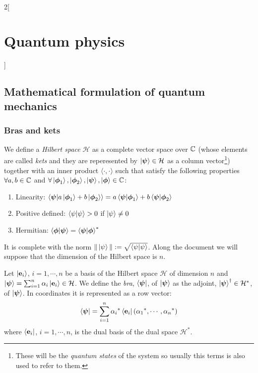 \documentclass[../../../main.tex]{subfiles}
\begin{document}
\renewcommand{\col}{\phy}
\begin{multicols}{2}[\section{Quantum physics}]
  \subsection{Mathematical formulation of quantum mechanics}
  \subsubsection{Bras and kets}
  \begin{definition}[Ket]
    We define a \emph{Hilbert space} $\mathcal{H}$ as a complete vector space over $\mathbb{C}$ (whose elements are called \emph{kets} and they are reperesented by $\ket{\boldsymbol{\mathrm{\psi}}}\in\mathcal{H}$ as a column vector\footnote{These will be the \emph{quantum states} of the system so usually this terms is also used to refer to them.}) together with an inner product $\langle\cdot,\cdot\rangle$ such that satisfy the following properties $\forall a,b\in\mathbb{C}$ and $\forall \ket{\boldsymbol{\mathrm{\phi}}_1},\ket{\boldsymbol{\mathrm{\phi}}_2},\ket{\boldsymbol{\mathrm{\psi}}},\ket{\boldsymbol{\mathrm{\phi}}}\in \mathbb{C}$:
    \begin{enumerate}
      \item Linearity: $\braket{\boldsymbol{\mathrm{\psi}}}{a\ket{\boldsymbol{\mathrm{\phi}}_1}+b\ket{\boldsymbol{\mathrm{\phi}}_2}}=a\braket{\boldsymbol{\mathrm{\psi}}}{\boldsymbol{\mathrm{\phi}}_1}+b\braket{\boldsymbol{\mathrm{\psi}}}{\boldsymbol{\mathrm{\phi}}_2}$
      \item Positive defined: $\braket{\psi}{\psi}>0$ if $\ket{\psi}\ne 0$
      \item Hermitian: $\braket{\boldsymbol{\mathrm{\phi}}}{\boldsymbol{\mathrm{\psi}}}={\braket{\boldsymbol{\mathrm{\psi}}}{\boldsymbol{\mathrm{\phi}}}}^*$
    \end{enumerate}
    It is complete with the norm $\|\ket{\psi}\|:=\sqrt{\braket{\psi}{\psi}}$. Along the document we will suppose that the dimension of the Hilbert space is $n$.
  \end{definition}
  \begin{definition}[Bra]
    Let $\ket{\boldsymbol{\mathrm{e}}_i}$, $i=1,\cdots,n$ be a basis of the Hilbert space $\mathcal{H}$ of dimension $n$ and $\ket{\boldsymbol{\mathrm{\psi}}}=\sum_{i=1}^n\alpha_i\ket{\boldsymbol{\mathrm{e}}_i}\in\mathcal{H}$. We define the \emph{bra}, $\bra{\boldsymbol{\mathrm{\psi}}}$, of $\ket{\boldsymbol{\mathrm{\psi}}}$ as the adjoint, ${\ket{\boldsymbol{\mathrm{\psi}}}}^\dag\in\mathcal{H}^*$, of $\ket{\boldsymbol{\mathrm{\psi}}}$. In coordinates it is represented as a row vector:
    $$\bra{\boldsymbol{\mathrm{\psi}}}=\sum_{i=1}^n{\alpha_i}^*\bra{\boldsymbol{\mathrm{e}}_i}({\alpha_1}^*,\cdots,{\alpha_n}^*)$$ where $\bra{\boldsymbol{\mathrm{e}}_i}$, $i=1,\cdots,n$, is the dual basis of the dual space $\mathcal{H}^*$.
  \end{definition}

\end{multicols}
\end{document}
